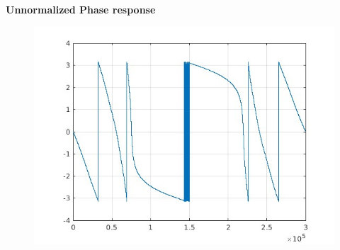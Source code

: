 \documentclass{article}
\begin{document}
\textbf{Unnormalized Phase response}
\begin{figure}[H]
\hspace*{-2.5cm}
    \centering
    \includegraphics[scale = 0.5]{bsf_cheby_phase.jpg}
    \label{fig:my_label}
\end{figure}
\end{document}
